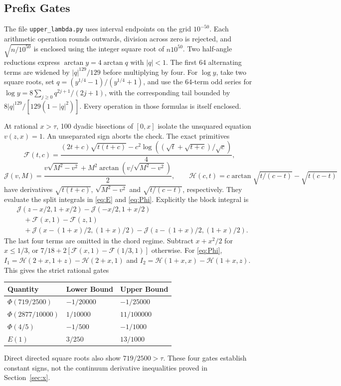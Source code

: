 \documentclass[11pt,letterpaper]{article}
\begin{document}
\subsection{Prefix Gates}
The file \texttt{upper\_lambda.py} uses interval endpoints on the grid
$10^{-50}$. Each arithmetic operation rounds outwards, division across
zero is rejected, and $\sqrt{n/10^{50}}$ is enclosed using the integer
square root of $n10^{50}$. Two half-angle reductions express
$\arctan y=4\arctan q$ with $|q|<1$. The first 64 alternating terms
are widened by $|q|^{129}/129$ before multiplying by four.
For $\log y$, take two square roots, set
$q=(y^{1/4}-1)/(y^{1/4}+1)$, and use the 64-term odd series for
$\log y=8\sum_{j\ge0}q^{2j+1}/(2j+1)$, with the corresponding
tail bounded by $8|q|^{129}/[129(1-|q|^2)]$.
Every operation in those formulas is itself enclosed.

At rational $x>\tau$, 100 dyadic bisections of $[0,x]$ isolate the
unsquared equation $v(z,x)=1$. An unseparated sign aborts the check.
The exact primitives
\[
 \mathcal F(t,c)=\frac{(2t+c)\sqrt{t(t+c)}
     -c^2\log((\sqrt t+\sqrt{t+c})/\sqrt c)}4,
\]
\[
 \mathcal J(v,M)=\frac{v\sqrt{M^2-v^2}
                +M^2\arctan(v/\sqrt{M^2-v^2})}2,
 \qquad
 \mathcal H(c,t)=c\arctan\sqrt{t/(c-t)}-\sqrt{t(c-t)}
\]
have derivatives $\sqrt{t(t+c)}$, $\sqrt{M^2-v^2}$ and
$\sqrt{t/(c-t)}$, respectively. They evaluate the split integrals in
\eqref{eq:E} and \eqref{eq:Phi}. Explicitly the block integral is
\begin{align*}
 &\mathcal J(z-x/2,1+x/2)-\mathcal J(-x/2,1+x/2)\\
 &\quad+\mathcal F(x,1)-\mathcal F(z,1)\\
 &\quad+\mathcal J(x-(1+x)/2,(1+x)/2)
 -\mathcal J(z-(1+x)/2,(1+x)/2).
\end{align*}
The last four terms are omitted in the chord regime. Subtract
$x+x^2/2$ for $x\le1/3$, or
$7/18+2[\mathcal F(x,1)-\mathcal F(1/3,1)]$ otherwise.
For \eqref{eq:Phi},
$I_1=\mathcal H(2+x,1+z)-\mathcal H(2+x,1)$ and
$I_2=\mathcal H(1+x,x)-\mathcal H(1+x,z)$.
This gives the strict rational gates
\begin{center}
\begin{tabular}{lll}\toprule
Quantity & Lower Bound & Upper Bound\\\midrule
$\Phi(719/2500)$ & $-1/20000$ & $-1/25000$\\
$\Phi(2877/10000)$ & $1/10000$ & $11/100000$\\
$\Phi(4/5)$ & $-1/500$ & $-1/1000$\\
$E(1)$ & $3/250$ & $13/1000$\\\bottomrule
\end{tabular}
\end{center}
Direct directed square roots also show $719/2500>\tau$.
These four gates establish constant signs, not the continuum derivative
inequalities proved in Section~\ref{sec:x}.
\end{document}
